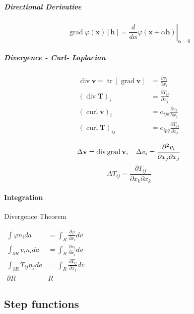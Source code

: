 \hypertarget{directional-derivative}{%
\subparagraph{Directional Derivative}\label{directional-derivative}}

\[\operatorname{grad} \varphi(\mathbf{x})[\mathbf{h}]=\left.\frac{d}{d \alpha} \varphi(\mathbf{x}+\alpha \mathbf{h})\right|_{\alpha=0}\]

\hypertarget{divergence---curl--laplacian}{%
\subparagraph{Divergence - Curl-
Laplacian}\label{divergence---curl--laplacian}}

\[\begin{aligned} \operatorname{div} \mathbf{v}=\operatorname{tr}[\operatorname{grad} \mathbf{v}] &=\frac{\partial v_{i}}{\partial x_{i}} \\(\operatorname{div} \mathbf{T})_{i} &=\frac{\partial T_{i j}}{\partial x_{j}} \\(\operatorname{curl} \mathbf{v})_{i} &=e_{i j k} \frac{\partial v_{k}}{\partial x_{j}} \\(\operatorname{curl} \mathbf{T})_{i j} &=e_{i p q} \frac{\partial T_{j q}}{\partial x_{p}} \end{aligned}\]

\[\Delta \mathbf{v}=\operatorname{div} \operatorname{grad} \mathbf{v}, \quad \Delta v_{i}=\frac{\partial^{2} v_{i}}{\partial x_{j} \partial x_{j}}\\\]
\[\Delta T_{i j}=\frac{\partial T_{i j}}{\partial x_{k} \partial x_{k}}\]

\hypertarget{integration}{%
\paragraph{Integration}\label{integration}}

Divergence Theorem

\(\begin{array}{rl}{\int \varphi n_{i} d a} & {=\int_{R} \frac{\partial \varphi}{\partial x_{i}} d v} \\ {\int_{\partial R} v_{i} n_{i} d a} & {=\int_{R} \frac{\partial v_{i}}{\partial x_{i}} d v} \\ {\int_{\partial R} T_{i j} n_{j} d a} & {=\int_{R} \frac{\partial T_{i j}}{\partial x_{j}} d v} \\ {\partial R} & {R}\end{array}\)

\hypertarget{step-functions}{%
\subsection{Step functions}\label{step-functions}}

